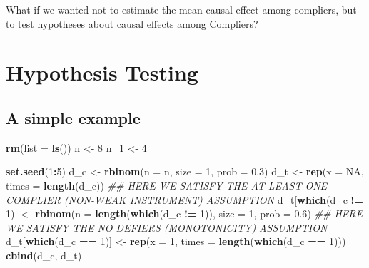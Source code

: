 \documentclass[12pt,leqno]{article}
\newenvironment{Shaded}{\begin{snugshade}}{\end{snugshade}}
\newcommand{\CommentTok}[1]{\textcolor[rgb]{0.56,0.35,0.01}{\textit{#1}}}
\newcommand{\DataTypeTok}[1]{\textcolor[rgb]{0.13,0.29,0.53}{#1}}
\newcommand{\DecValTok}[1]{\textcolor[rgb]{0.00,0.00,0.81}{#1}}
\newcommand{\FloatTok}[1]{\textcolor[rgb]{0.00,0.00,0.81}{#1}}
\newcommand{\KeywordTok}[1]{\textcolor[rgb]{0.13,0.29,0.53}{\textbf{#1}}}
\newcommand{\NormalTok}[1]{#1}
\newcommand{\OperatorTok}[1]{\textcolor[rgb]{0.81,0.36,0.00}{\textbf{#1}}}
\newcommand{\OtherTok}[1]{\textcolor[rgb]{0.56,0.35,0.01}{#1}}
\newcommand{\StringTok}[1]{\textcolor[rgb]{0.31,0.60,0.02}{#1}}
\theoremstyle{newstyle}
\begin{document}
What if we wanted not to estimate the mean causal effect among
compliers, but to test hypotheses about causal effects among Compliers?

\hypertarget{hypothesis-testing}{%
\section{Hypothesis Testing}\label{hypothesis-testing}}

\hypertarget{a-simple-example}{%
\subsection{A simple example}\label{a-simple-example}}

\begin{Shaded}
\begin{Highlighting}[]
\KeywordTok{rm}\NormalTok{(}\DataTypeTok{list =} \KeywordTok{ls}\NormalTok{())}
\NormalTok{n <-}\StringTok{ }\DecValTok{8}
\NormalTok{n_}\DecValTok{1}\NormalTok{ <-}\StringTok{ }\DecValTok{4}

\KeywordTok{set.seed}\NormalTok{(}\DecValTok{1}\OperatorTok{:}\DecValTok{5}\NormalTok{)}
\NormalTok{d_c <-}\StringTok{ }\KeywordTok{rbinom}\NormalTok{(}\DataTypeTok{n =}\NormalTok{ n, }\DataTypeTok{size =} \DecValTok{1}\NormalTok{, }\DataTypeTok{prob =} \FloatTok{0.3}\NormalTok{)}
\NormalTok{d_t <-}\StringTok{ }\KeywordTok{rep}\NormalTok{(}\DataTypeTok{x =} \OtherTok{NA}\NormalTok{, }\DataTypeTok{times =} \KeywordTok{length}\NormalTok{(d_c))}
\CommentTok{## HERE WE SATISFY THE AT LEAST ONE COMPLIER (NON-WEAK INSTRUMENT) ASSUMPTION}
\NormalTok{d_t[}\KeywordTok{which}\NormalTok{(d_c }\OperatorTok{!=}\StringTok{ }\DecValTok{1}\NormalTok{)] <-}\StringTok{ }\KeywordTok{rbinom}\NormalTok{(}\DataTypeTok{n =} \KeywordTok{length}\NormalTok{(}\KeywordTok{which}\NormalTok{(d_c }\OperatorTok{!=}\StringTok{ }\DecValTok{1}\NormalTok{)), }\DataTypeTok{size =} \DecValTok{1}\NormalTok{, }\DataTypeTok{prob =} \FloatTok{0.6}\NormalTok{)}
\CommentTok{## HERE WE SATISFY THE NO DEFIERS (MONOTONICITY) ASSUMPTION}
\NormalTok{d_t[}\KeywordTok{which}\NormalTok{(d_c }\OperatorTok{==}\StringTok{ }\DecValTok{1}\NormalTok{)] <-}\StringTok{ }\KeywordTok{rep}\NormalTok{(}\DataTypeTok{x =} \DecValTok{1}\NormalTok{, }\DataTypeTok{times =} \KeywordTok{length}\NormalTok{(}\KeywordTok{which}\NormalTok{(d_c }\OperatorTok{==}\StringTok{ }\DecValTok{1}\NormalTok{)))}
\KeywordTok{cbind}\NormalTok{(d_c, d_t)}
\end{Highlighting}
\end{Shaded}
\end{document}
